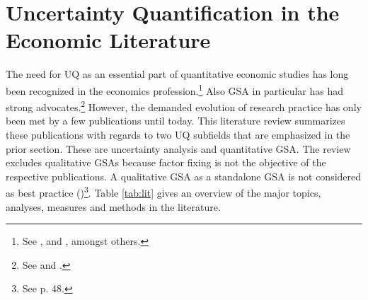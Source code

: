 \section{Uncertainty Quantification in the Economic Literature}
\thispagestyle{plain} %

The need for UQ as an essential part of quantitative economic studies has long been recognized in the economics profession.\footnote{See \cite{Hansen.1996}, \cite{Kydland.1992} and \cite{Canova.1994}, amongst others.} Also GSA in particular has had strong advocates.\footnote{See \cite{Canova.1995} and \cite{Gregory.1995}.} However, the demanded evolution of research practice has only been met by a few publications until today. This literature review summarizes these publications with regards to two UQ subfields that are emphasized in the prior section. These are uncertainty analysis and quantitative GSA. The review excludes qualitative GSAs because factor fixing is not the objective of the respective publications. A qualitative GSA as a standalone GSA is not considered as best practice (\cite{Saltelli.2004})\footnote{See p. 48.}. Table \ref{tab:lit} gives an overview of the major topics, analyses, measures and methods in the literature.\\

